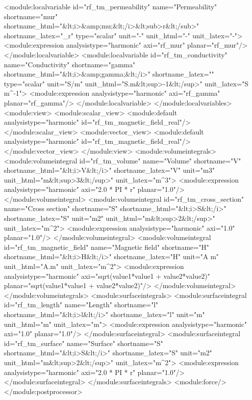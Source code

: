 \documentclass[12pt,a4paper,oneside]{article}
\numberwithin{equation}{section} %
\numberwithin{figure}{section} %
\numberwithin{table}{section} %
\begin{document}
\begin{spverbatim}
    <module:localvariable id="rf_tm_permeability" name="Permeability" shortname="mur" shortname_html="&lt;i>&amp;mu;&lt;/i>&lt;sub>r&lt;/sub>" shortname_latex="\mu_{r}" type="scalar" unit="-" unit_html="-" unit_latex="-">
      <module:expression analysistype="harmonic" axi="rf_mur" planar="rf_mur"/>
    </module:localvariable>
    <module:localvariable id="rf_tm_conductivity" name="Conductivity" shortname="gamma" shortname_html="&lt;i>&amp;gamma;&lt;/i>" shortname_latex="\gamma" type="scalar" unit="S/m" unit_html="S.m&lt;sup>-1&lt;/sup>" unit_latex="S \cdot m^{-1}">
      <module:expression analysistype="harmonic" axi="rf_gamma" planar="rf_gamma"/>
    </module:localvariable>
    </module:localvariables>
    <module:view>
      <module:scalar_view>
        <module:default analysistype="harmonic" id="rf_tm_magnetic_field_real"/>
      </module:scalar_view>
      <module:vector_view>
        <module:default analysistype="harmonic" id="rf_tm_magnetic_field_real"/>
      </module:vector_view>
    </module:view>
    <module:volumeintegrals>
      <module:volumeintegral id="rf_tm_volume" name="Volume" shortname="V" shortname_html="&lt;i>V&lt;/i>" shortname_latex="V" unit="m3" unit_html="m&lt;sup>3&lt;/sup>" unit_latex="m^{3}">
        <module:expression analysistype="harmonic" axi="2.0 * PI * r" planar="1.0"/>
      </module:volumeintegral>
      <module:volumeintegral id="rf_tm_cross_section" name="Cross section" shortname="S" shortname_html="&lt;i>S&lt;/i>" shortname_latex="S" unit="m2" unit_html="m&lt;sup>2&lt;/sup>" unit_latex="m^{2}">
        <module:expression analysistype="harmonic" axi="1.0" planar="1.0"/>
      </module:volumeintegral>
      <module:volumeintegral id="rf_tm_magnetic_field" name="Magnetic field" shortname="H" shortname_html="&lt;i>H&lt;/i>" shortname_latex="H" unit="A m" unit_html="A.m" unit_latex="m^{2}">
        <module:expression analysistype="harmonic" axi="sqrt(value1*value1 + value2*value2)" planar="sqrt(value1*value1 + value2*value2)"/>
      </module:volumeintegral>
    </module:volumeintegrals>
    <module:surfaceintegrals>
      <module:surfaceintegral id="rf_tm_length" name="Length" shortname="l" shortname_html="&lt;i>l&lt;/i>" shortname_latex="l" unit="m" unit_html="m" unit_latex="m">
        <module:expression analysistype="harmonic" axi="1.0" planar="1.0"/>
      </module:surfaceintegral>
      <module:surfaceintegral id="rf_tm_surface" name="Surface" shortname="S" shortname_html="&lt;i>S&lt;/i>" shortname_latex="S" unit="m2" unit_html="m&lt;sup>2&lt;/sup>" unit_latex="m^{2}">
        <module:expression analysistype="harmonic" axi="2.0 * PI * r" planar="1.0"/>
      </module:surfaceintegral>
    </module:surfaceintegrals>
    <module:force/>
  </module:postprocessor>
\end{spverbatim}
\end{document}
